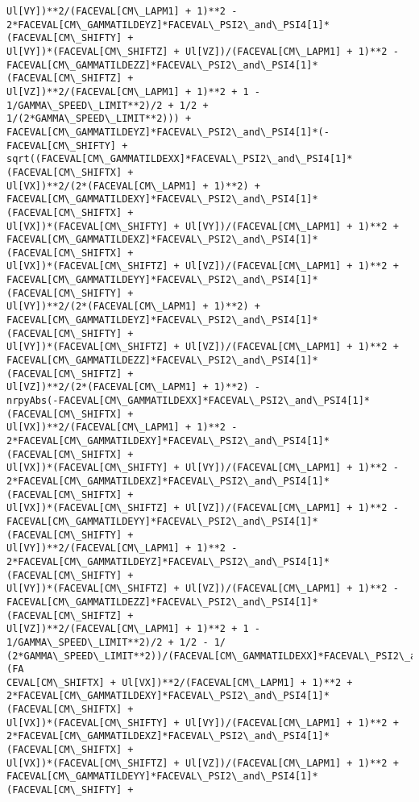 \documentclass[landscape,letterpaper,10pt,english]{article}
\begin{document}
\begin{Verbatim}[commandchars=\\\{\}]
Ul[VY])**2/(FACEVAL[CM\_LAPM1] + 1)**2 -
2*FACEVAL[CM\_GAMMATILDEYZ]*FACEVAL\_PSI2\_and\_PSI4[1]*(FACEVAL[CM\_SHIFTY] +
Ul[VY])*(FACEVAL[CM\_SHIFTZ] + Ul[VZ])/(FACEVAL[CM\_LAPM1] + 1)**2 -
FACEVAL[CM\_GAMMATILDEZZ]*FACEVAL\_PSI2\_and\_PSI4[1]*(FACEVAL[CM\_SHIFTZ] +
Ul[VZ])**2/(FACEVAL[CM\_LAPM1] + 1)**2 + 1 - 1/GAMMA\_SPEED\_LIMIT**2)/2 + 1/2 +
1/(2*GAMMA\_SPEED\_LIMIT**2))) +
FACEVAL[CM\_GAMMATILDEYZ]*FACEVAL\_PSI2\_and\_PSI4[1]*(-FACEVAL[CM\_SHIFTY] +
sqrt((FACEVAL[CM\_GAMMATILDEXX]*FACEVAL\_PSI2\_and\_PSI4[1]*(FACEVAL[CM\_SHIFTX] +
Ul[VX])**2/(2*(FACEVAL[CM\_LAPM1] + 1)**2) +
FACEVAL[CM\_GAMMATILDEXY]*FACEVAL\_PSI2\_and\_PSI4[1]*(FACEVAL[CM\_SHIFTX] +
Ul[VX])*(FACEVAL[CM\_SHIFTY] + Ul[VY])/(FACEVAL[CM\_LAPM1] + 1)**2 +
FACEVAL[CM\_GAMMATILDEXZ]*FACEVAL\_PSI2\_and\_PSI4[1]*(FACEVAL[CM\_SHIFTX] +
Ul[VX])*(FACEVAL[CM\_SHIFTZ] + Ul[VZ])/(FACEVAL[CM\_LAPM1] + 1)**2 +
FACEVAL[CM\_GAMMATILDEYY]*FACEVAL\_PSI2\_and\_PSI4[1]*(FACEVAL[CM\_SHIFTY] +
Ul[VY])**2/(2*(FACEVAL[CM\_LAPM1] + 1)**2) +
FACEVAL[CM\_GAMMATILDEYZ]*FACEVAL\_PSI2\_and\_PSI4[1]*(FACEVAL[CM\_SHIFTY] +
Ul[VY])*(FACEVAL[CM\_SHIFTZ] + Ul[VZ])/(FACEVAL[CM\_LAPM1] + 1)**2 +
FACEVAL[CM\_GAMMATILDEZZ]*FACEVAL\_PSI2\_and\_PSI4[1]*(FACEVAL[CM\_SHIFTZ] +
Ul[VZ])**2/(2*(FACEVAL[CM\_LAPM1] + 1)**2) -
nrpyAbs(-FACEVAL[CM\_GAMMATILDEXX]*FACEVAL\_PSI2\_and\_PSI4[1]*(FACEVAL[CM\_SHIFTX] +
Ul[VX])**2/(FACEVAL[CM\_LAPM1] + 1)**2 -
2*FACEVAL[CM\_GAMMATILDEXY]*FACEVAL\_PSI2\_and\_PSI4[1]*(FACEVAL[CM\_SHIFTX] +
Ul[VX])*(FACEVAL[CM\_SHIFTY] + Ul[VY])/(FACEVAL[CM\_LAPM1] + 1)**2 -
2*FACEVAL[CM\_GAMMATILDEXZ]*FACEVAL\_PSI2\_and\_PSI4[1]*(FACEVAL[CM\_SHIFTX] +
Ul[VX])*(FACEVAL[CM\_SHIFTZ] + Ul[VZ])/(FACEVAL[CM\_LAPM1] + 1)**2 -
FACEVAL[CM\_GAMMATILDEYY]*FACEVAL\_PSI2\_and\_PSI4[1]*(FACEVAL[CM\_SHIFTY] +
Ul[VY])**2/(FACEVAL[CM\_LAPM1] + 1)**2 -
2*FACEVAL[CM\_GAMMATILDEYZ]*FACEVAL\_PSI2\_and\_PSI4[1]*(FACEVAL[CM\_SHIFTY] +
Ul[VY])*(FACEVAL[CM\_SHIFTZ] + Ul[VZ])/(FACEVAL[CM\_LAPM1] + 1)**2 -
FACEVAL[CM\_GAMMATILDEZZ]*FACEVAL\_PSI2\_and\_PSI4[1]*(FACEVAL[CM\_SHIFTZ] +
Ul[VZ])**2/(FACEVAL[CM\_LAPM1] + 1)**2 + 1 - 1/GAMMA\_SPEED\_LIMIT**2)/2 + 1/2 - 1/
(2*GAMMA\_SPEED\_LIMIT**2))/(FACEVAL[CM\_GAMMATILDEXX]*FACEVAL\_PSI2\_and\_PSI4[1]*(FA
CEVAL[CM\_SHIFTX] + Ul[VX])**2/(FACEVAL[CM\_LAPM1] + 1)**2 +
2*FACEVAL[CM\_GAMMATILDEXY]*FACEVAL\_PSI2\_and\_PSI4[1]*(FACEVAL[CM\_SHIFTX] +
Ul[VX])*(FACEVAL[CM\_SHIFTY] + Ul[VY])/(FACEVAL[CM\_LAPM1] + 1)**2 +
2*FACEVAL[CM\_GAMMATILDEXZ]*FACEVAL\_PSI2\_and\_PSI4[1]*(FACEVAL[CM\_SHIFTX] +
Ul[VX])*(FACEVAL[CM\_SHIFTZ] + Ul[VZ])/(FACEVAL[CM\_LAPM1] + 1)**2 +
FACEVAL[CM\_GAMMATILDEYY]*FACEVAL\_PSI2\_and\_PSI4[1]*(FACEVAL[CM\_SHIFTY] +

\end{Verbatim}
\end{document}
